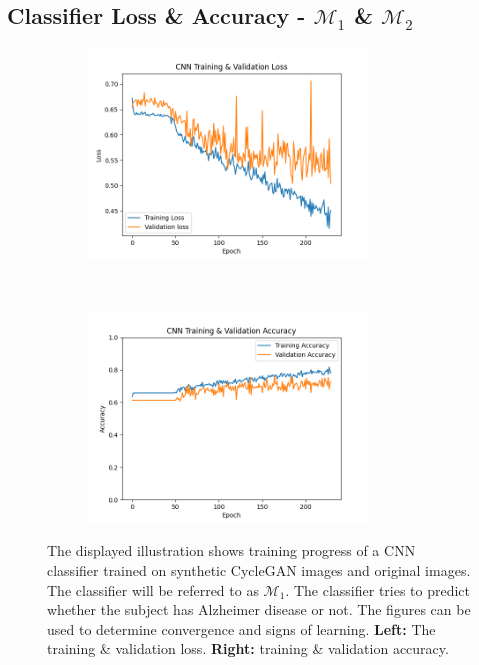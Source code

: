 \documentclass[11pt, fleqn, titlepage]{article}
\newcommand{\1}[1]{\mathds{1}\left[#1\right]}
\begin{document}
\subsection{Classifier Loss \& Accuracy - $ \mathcal M_1 $ \& $ \mathcal M_2 $ }\label{result_loss_cnn}
\vspace*{-0.75cm}
\begin{figure}[H]
	\centering
	\begin{subfigure}[t]{0.5\textwidth}
		\centering
		\includegraphics[height=2.2in]{imgs/classifier/lr_0.0002_loss_curve}%
	\end{subfigure}%
	~
	\begin{subfigure}[t]{0.5\textwidth}
	\centering
	\includegraphics[height=2.2in]{imgs/classifier/lr_0.0002_accuracy_curve}%

\end{subfigure}
	\caption{The displayed illustration shows training progress of a CNN classifier trained on synthetic CycleGAN images and original images. The classifier will be referred to as $ \mathcal M_1 $. The classifier tries to predict whether the subject has Alzheimer disease or not. The figures can be used to determine convergence and signs of learning. \textbf{Left:} The training \& validation loss. \textbf{Right:} training \& validation accuracy.}
		\label{fig:loss_acc}
\end{figure}
\end{document}
